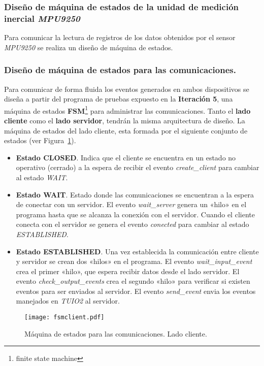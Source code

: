\subsubsection{Diseño de máquina de estados de la unidad de medición inercial \emph{MPU9250}}
Para comunicar la lectura de registros de los datos obtenidos por el sensor \emph{MPU9250} se realiza un diseño de máquina de estados.
\subsubsection{Diseño de máquina de estados para las comunicaciones.}
Para comunicar de forma fluida los eventos generados en ambos dispositivos se diseña a partir del programa de pruebas expuesto en la \textbf{Iteración 5}, una máquina de estados \textbf{FSM}\footnote{finite state machine} para administrar las comunicaciones. Tanto el \textbf{lado cliente} como el \textbf{lado servidor}, tendrán la misma arquitectura de diseño. La máquina de estados del lado cliente, esta formada por el siguiente conjunto de estados (ver Figura~\ref{fig:fsmclient}).\
\begin{itemize}
\item \textbf{Estado CLOSED}. Indica que el cliente se encuentra en un estado no operativo (cerrado) a la espera de recibir el evento \emph{create\_client} para cambiar al estado \emph{WAIT}.
\item \textbf{Estado WAIT}. Estado donde las comunicaciones se encuentran a la espera de conectar con un servidor. El evento \emph{wait\_server} genera un «hilo» en el programa hasta que se alcanza la conexión con el servidor. Cuando el cliente conecta con el servidor se genera el evento \emph{conected} para cambiar al estado \emph{ESTABLISHED}.
\item \textbf{Estado ESTABLISHED}. Una vez establecida la comunicación entre cliente y servidor se crean dos «hilos» en el programa. El evento \emph{wait\_input\_event} crea el primer «hilo», que espera recibir datos desde el lado servidor. El evento \emph{check\_output\_events} crea el segundo «hilo» para verificar si existen eventos para ser enviados al servidor. El evento \emph{send\_event} envia los eventos manejados en \emph{TUIO2} al servidor.\
\end{itemize}
\begin{figure}[!h]
\begin{center}
\texttt{[image: fsmclient.pdf]}
\caption{Máquina de estados para las comunicaciones. Lado cliente. }
\label{fig:fsmclient}
\end{center}
\end{figure}
